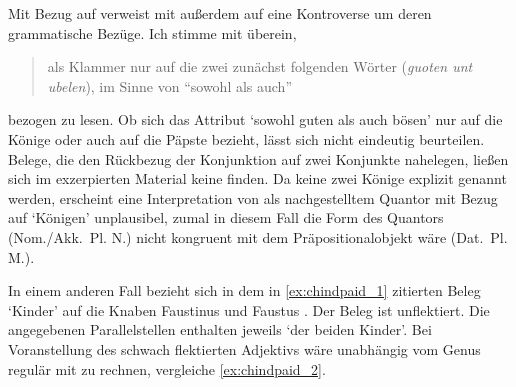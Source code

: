 Mit Bezug auf  verweist \citet[26,
Anm.~45]{weis2022} mit \citet[55, Anm.~87]{dickhutbielsky2015} außerdem auf
eine Kontroverse um deren grammatische Bezüge. Ich stimme mit \citet{haupt2019}
überein,  \blockcquote[239]{haupt2019}{als Klammer
nur auf die zwei zunächst folgenden Wörter (\textit{guoten unt ubelen}), im
Sinne von \enquote{sowohl als auch}} bezogen zu lesen. Ob sich das Attribut
 `sowohl guten als auch bösen' nur auf
die Könige oder auch auf die Päpste bezieht, lässt sich nicht eindeutig
beurteilen. Belege, die den Rückbezug der Konjunktion  auf zwei
Konjunkte nahelegen, ließen sich im exzerpierten Material keine finden. Da
keine zwei Könige explizit genannt werden, erscheint eine Interpretation von
 als nachgestelltem Quantor mit Bezug auf 
`Königen' unplausibel, zumal in diesem Fall die Form des Quantors
(Nom./Akk.~Pl. N.) nicht kongruent mit dem Präpositionalobjekt wäre (Dat.~Pl.
M.).

In einem anderen Fall bezieht sich in dem in \cref{ex:chindpaid_1} zitierten
Beleg  `Kinder' auf die Knaben Faustinus und Faustus
\autocites[\pno~10\rb, 5--6]{kc:M}[vgl.][1239--1240]{schroeder1895}. Der Beleg
ist unflektiert. Die angegebenen Parallelstellen enthalten jeweils  `der beiden Kinder'. Bei Voranstellung des schwach
flektierten Adjektivs wäre unabhängig vom Genus regulär mit  zu
rechnen, vergleiche \cref{ex:chindpaid_2}.

